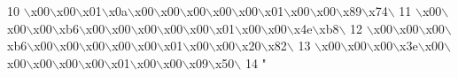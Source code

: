 \begin{DoxyCode}
10 \textcolor{stringliteral}{\(\backslash\)x00\(\backslash\)x00\(\backslash\)x01\(\backslash\)x0a\(\backslash\)x00\(\backslash\)x00\(\backslash\)x00\(\backslash\)x00\(\backslash\)x00\(\backslash\)x01\(\backslash\)x00\(\backslash\)x00\(\backslash\)x89\(\backslash\)x74\(\backslash\)}
11 \textcolor{stringliteral}{\(\backslash\)x00\(\backslash\)x00\(\backslash\)x00\(\backslash\)xb6\(\backslash\)x00\(\backslash\)x00\(\backslash\)x00\(\backslash\)x00\(\backslash\)x00\(\backslash\)x01\(\backslash\)x00\(\backslash\)x00\(\backslash\)x4e\(\backslash\)xb8\(\backslash\)}
12 \textcolor{stringliteral}{\(\backslash\)x00\(\backslash\)x00\(\backslash\)x00\(\backslash\)xb6\(\backslash\)x00\(\backslash\)x00\(\backslash\)x00\(\backslash\)x00\(\backslash\)x00\(\backslash\)x01\(\backslash\)x00\(\backslash\)x00\(\backslash\)x20\(\backslash\)x82\(\backslash\)}
13 \textcolor{stringliteral}{\(\backslash\)x00\(\backslash\)x00\(\backslash\)x00\(\backslash\)x3e\(\backslash\)x00\(\backslash\)x00\(\backslash\)x00\(\backslash\)x00\(\backslash\)x00\(\backslash\)x01\(\backslash\)x00\(\backslash\)x00\(\backslash\)x09\(\backslash\)x50\(\backslash\)}
14 \textcolor{stringliteral}{"}
\end{DoxyCode}
